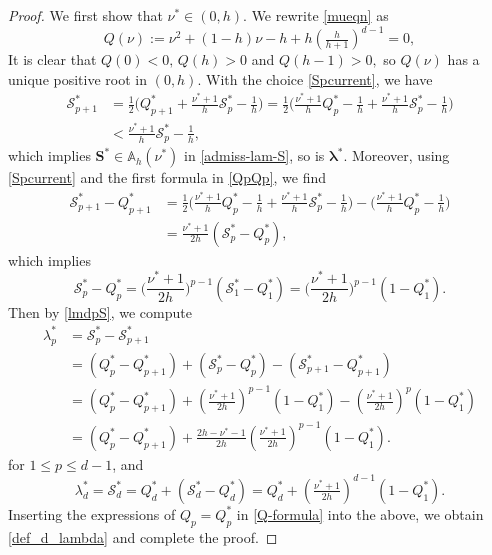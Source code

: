 \documentclass[10pt,reqno,final]{amsart}
\theoremstyle{remark}
\theoremstyle{definition}
\newcommand{\bs}[1]{\boldsymbol{#1}}
\begin{document}
\begin{proof}
We first show that  $\nu^*\in (0,h).$ We rewrite \eqref{mueqn} as
$$
Q(\nu):=\nu^2 +(1-h)\nu- h+h   (\tfrac{h}{h+1})^{d-1}=0,
$$
It is clear that $Q(0)<0,\, Q(h)>0$ and $Q(h-1)>0,$ so 
$Q(\nu)$ has a unique positive root in $(0,h).$
With the choice \eqref{Spcurrent}, we have 
\begin{equation*}
\begin{split}
{\mathcal S}_{p+1}^*&=\frac{1}{2}\Big(Q^*_{p+1}+\frac{\nu^*+1}{h}{\mathcal S}_p^*-\frac{1}{h}\Big)=\frac{1}{2}\Big(\frac{\nu^*+1}{h}Q^*_p-\frac{1}{h}+\frac{\nu^*+1}{h}{\mathcal S}_p^*-\frac{1}{h}\Big)\\
&<\frac{\nu^*+1}{h}{\mathcal S}_p^*-\frac{1}{h},
\end{split}
\end{equation*}
which implies $\bs S^*\in {\mathbb A}_h(\nu^*)$ in
\eqref{admiss-lam-S}, so is $\bs \lambda^*.$  
Moreover,  using \eqref{Spcurrent}  and the first formula in
\eqref{QpQp}, we find
\begin{equation*}
\begin{aligned}
{\mathcal S}_{p+1}^*-Q_{p+1}^*&=\frac{1}{2}\bigg(\frac{\nu^*+1}{h}Q^*_p-\frac{1}{h}+\frac{\nu^*+1}{h}{\mathcal S}_p^*-\frac{1}{h}\bigg)-\bigg(\frac{\nu^*+1}{h}Q^*_p-\frac{1}{h}\bigg) \\
&=\frac{\nu^*+1}{2h}({\mathcal S}_{p}^*-Q_{p}^*),
\end{aligned}
\end{equation*}
which implies
$${\mathcal S}_{p}^*-Q_{p}^*=\Big(\frac{\nu^*+1}{2h}\Big)^{p-1}({\mathcal S}_1^*-Q_1^*)=\Big(\frac{\nu^*+1}{2h}\Big)^{p-1}(1-Q_1^*).$$
Then by \eqref{lmdpS},
we compute 
\begin{equation}
\begin{aligned}
\lambda_p^* &={\mathcal S}_p^*-{\mathcal S}_{p+1}^*\\
&=(Q_p^*-Q_{p+1}^*)+({\mathcal S}_p^*-Q_p^*)-({\mathcal S}_{p+1}^*-Q_{p+1}^*)\\
&=(Q_p^*-Q_{p+1}^*)+(\tfrac{\nu^*+1}{2h})^{p-1}(1-Q_1^*)-(\tfrac{\nu^*+1}{2h})^{p}(1-Q_1^*)\\
&=(Q_p^*-Q_{p+1}^*)+\tfrac{2h-\nu^*-1}{2h}(\tfrac{\nu^*+1}{2h})^{p-1}(1-Q_1^*).
\end{aligned}
\end{equation}
for $1\le p\le d-1$, and
$$\lambda_d^*={\mathcal S}_d^*=Q_d^*+({\mathcal S}_d^*-Q_d^*)=Q_d^*+(\tfrac{\nu^*+1}{2h})^{d-1}(1-Q_1^*).$$
Inserting the expressions of $Q_p=Q_p^*$  in \eqref{Q-formula} into the above, we obtain \eqref{def_d_lambda} and complete the proof.
\end{proof} 
\end{document}
